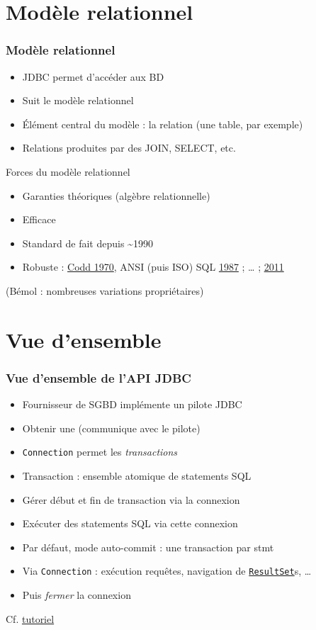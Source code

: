 \documentclass[english, french]{beamer}
\begin{document}
\section{Modèle relationnel}
\begin{frame}
	\frametitle{Modèle relationnel}
	\begin{itemize}
		\item JDBC permet d’accéder aux BD
		\item Suit le modèle relationnel
		\item Élément central du modèle : la relation (une table, par exemple)
		\item Relations produites par des JOIN, SELECT, etc.
	\end{itemize}
	\begin{block}{Forces du modèle relationnel}
		\pause
		\begin{itemize}
			\item Garanties théoriques (algèbre relationnelle)
			\item Efficace
			\item Standard de fait depuis \textasciitilde 1990
			\item Robuste : \href{https://dl.acm.org/citation.cfm?id=362685}{Codd 1970}, ANSI (puis ISO) SQL \href{https://www.iso.org/iso/home/store/catalogue_ics/catalogue_detail_ics.htm?csnumber=16661}{1987} ; … ; \href{https://www.iso.org/iso/home/store/catalogue_ics/catalogue_detail_ics.htm?csnumber=53681}{2011}
		\end{itemize}
	\end{block}
	(Bémol : nombreuses variations propriétaires)
\end{frame}

\section{Vue d’ensemble}
\begin{frame}
	\frametitle{Vue d’ensemble de l’API JDBC}
	\begin{itemize}
		\item Fournisseur de SGBD implémente un pilote JDBC
		\item Obtenir une  (communique avec le pilote)
		\item \texttt{Connection} permet les \emph{transactions}
		\item Transaction : ensemble atomique de \og{}statements\fg{} SQL
		\item Gérer début et fin de transaction via la connexion
		\item Exécuter des statements SQL via cette connexion
		\item Par défaut, mode auto-commit : une transaction par stmt
		\item Via \texttt{Connection} : exécution requêtes, navigation de \href{https://docs.oracle.com/javase/8/docs/api/java/sql/ResultSet.html}{\texttt{ResultSet}}s, …
		\item Puis \emph{fermer} la connexion
	\end{itemize}
	Cf. \href{https://docs.oracle.com/javase/tutorial/jdbc/}{tutoriel}
\end{frame}
\end{document}
